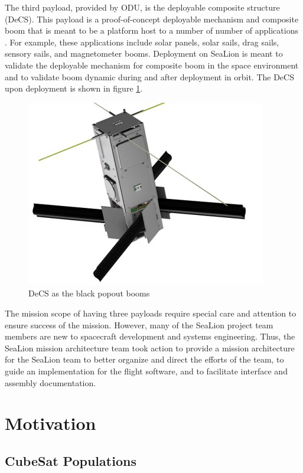 \documentclass[journal,article,submit,pdftex,moreauthors]{Definitions/mdpi}
\begin{document}
The third payload, provided by ODU, is the deployable composite structure (DeCS).  This payload is a proof-of-concept deployable mechanism and composite boom that is meant to be a platform host to a number of number of applications \cite{sealion_cdr}.  For example, these applications include solar panels, solar sails, drag sails, sensory sails, and magnetometer booms.  Deployment on SeaLion is meant to validate the deployable mechanism for composite boom in the space environment and to validate boom dynamic during and after deployment in orbit.  The DeCS upon deployment is shown in figure \ref{fig:DeCS}.

\begin{figure}[H]
    \includegraphics[width=10.5 cm]{assets/decs.png}
    \caption{DeCS as the black popout booms}
	\label{fig:DeCS}
    \end{figure}
	\noindent   
\unskip

The mission scope of having three payloads require special care and attention to ensure success of the mission.  However, many of the SeaLion project team members are new to spacecraft development and systems engineering.  Thus, the SeaLion mission architecture team took action to provide a mission architecture for the SeaLion team to better organize and direct the efforts of the team, to guide an implementation for the flight software, and to facilitate interface and assembly documentation.

\section{Motivation}
\subsection{CubeSat Populations}
\end{document}

